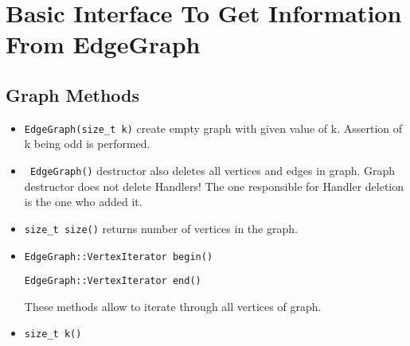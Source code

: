 \documentclass[a4paper,10pt]{article}
\begin{document}
\section*{Basic Interface To Get Information From EdgeGraph}
\subsection*{Graph Methods}
\begin{itemize}
\item \texttt{EdgeGraph(size\_t k)} create empty graph with given value of k. Assertion of k being odd is performed.
\item \texttt{~EdgeGraph()} destructor also deletes all vertices and edges in graph. Graph destructor does not delete Handlers! 
The one responsible for Handler deletion is the one who added it.
\item \texttt{size\_t size()} returns number of vertices in the graph.
\item \texttt{EdgeGraph::VertexIterator begin()}

\texttt{EdgeGraph::VertexIterator end()}

These methods allow to iterate through all vertices of graph.
\item \texttt {size\_t k()}

\end{itemize}
\end{document}
